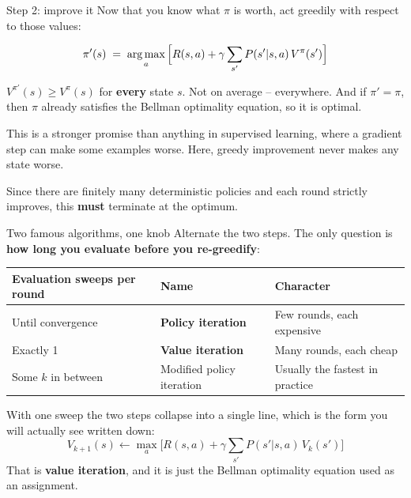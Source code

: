 \documentclass[aspectratio=169]{beamer}
\begin{document}
\begin{frame}{Step 2: improve it}
  \small
  Now that you know what $\pi$ is worth, act greedily with respect to those values:

  \vskip 4pt
  \begin{center}
  \begin{tcolorbox}[colback=lightbg, colframe=popblue, boxrule=0.7pt, arc=2pt, width=0.76\textwidth]
    \[ \pi'(s) \;=\; \mathop{\mathrm{arg\,max}}_a \Big[ R(s,a) + \gamma \sum_{s'} P(s'|s,a)\, V^\pi(s') \Big] \]
  \end{tcolorbox}
  \end{center}

  \vskip 8pt
  \begin{tcolorbox}[colback=paramgreen!8, colframe=paramgreen, boxrule=0.6pt, arc=2pt,
                    title={\textbf{The policy improvement theorem}}]
    \small
    $V^{\pi'}(s) \ge V^{\pi}(s)$ for \textbf{every} state $s$. Not on average -- everywhere.
    And if $\pi' = \pi$, then $\pi$ already satisfies the Bellman optimality equation, so it is
    optimal.

    \vskip 4pt
    This is a stronger promise than anything in supervised learning, where a gradient step can
    make some examples worse. Here, greedy improvement never makes any state worse.
  \end{tcolorbox}

  \vskip 6pt
  \small
  Since there are finitely many deterministic policies and each round strictly improves, this
  \textbf{must} terminate at the optimum.
\end{frame}

\begin{frame}{Two famous algorithms, one knob}
  \small
  Alternate the two steps. The only question is \textbf{how long you evaluate before you
  re-greedify}:

  \vskip 8pt
  \begin{center}
  \footnotesize
  \begin{tabular}{l l l}
    \toprule
    \textbf{Evaluation sweeps per round} & \textbf{Name} & \textbf{Character} \\
    \midrule
    Until convergence & \textbf{Policy iteration} & Few rounds, each expensive \\
    Exactly 1 & \textbf{Value iteration} & Many rounds, each cheap \\
    Some $k$ in between & Modified policy iteration & Usually the fastest in practice \\
    \bottomrule
  \end{tabular}
  \end{center}

  \vskip 10pt
  \begin{tcolorbox}[colback=armblue!8, colframe=armblue, boxrule=0.6pt, arc=2pt]
    \small
    With one sweep the two steps collapse into a single line, which is the form you will
    actually see written down:
    \[ V_{k+1}(s) \leftarrow \max_a \Big[ R(s,a) + \gamma \sum_{s'} P(s'|s,a)\, V_k(s') \Big] \]
    That is \textbf{value iteration}, and it is just the Bellman optimality equation used as an
    assignment.
  \end{tcolorbox}
\end{frame}
\end{document}

